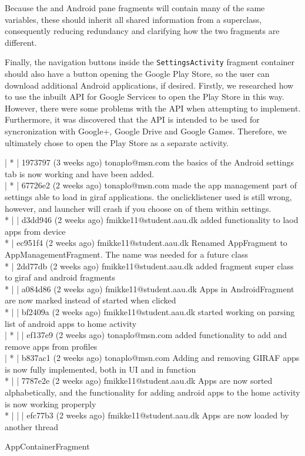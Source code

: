Because the \giraf and Android pane fragments will contain many of the same variables, these should inherit all shared information from a superclass, consequently reducing redundancy and clarifying how the two fragments are different.

Finally, the navigation buttons inside the \lstinline!SettingsActivity! fragment container should also have a button opening the Google Play Store, so the user can download additional Android applications, if desired. 
Firstly, we researched how to use the inbuilt API for Google Services  to open the Play Store in this way.
However, there were some problems with the API when attempting to implement.
Furthermore, it was discovered that the API is intended to be used for syncronization with Google+, Google Drive and Google Games.
Therefore, we ultimately chose to open the Play Store as a separate activity.


| * | 1973797 (3 weeks ago) tonaplo@msn.com the basics of the Android settings tab is now working and have been added.\\
| * | 67726e2 (2 weeks ago) tonaplo@msn.com made the app management part of settings able to load in giraf applications. the onclicklistener used is still wrong, however, and launcher will crash if you choose on of them within settings.\\
* | | d3dd946 (2 weeks ago) fmikke11@student.aau.dk added functionality to laod apps from device\\
* | ec951f4 (2 weeks ago) fmikke11@student.aau.dk Renamed AppFragment to AppManagementFragment. The name was needed for a future class\\
* | 2dd77db (2 weeks ago) fmikke11@student.aau.dk added fragment super class to giraf and android fragments\\
* | | a084d86 (2 weeks ago) fmikke11@student.aau.dk Apps in AndroidFragment are now marked instead of started when clicked\\
* | | bf2409a (2 weeks ago) fmikke11@student.aau.dk started working on parsing list of android apps to home activity\\
| * | | ef137e9 (2 weeks ago) tonaplo@msn.com added functionality to add and remove apps from profiles\\
| * | b837ac1 (2 weeks ago) tonaplo@msn.com Adding and removing GIRAF apps is now fully implemented, both in UI and in function\\
* | | 7787e2e (2 weeks ago) fmikke11@student.aau.dk Apps are now sorted alphabetically, and the functionality for adding android apps to the home activity is now working properply\\
* | | | efc77b3 (2 weeks ago) fmikke11@student.aau.dk Apps are now loaded by another thread

AppContainerFragment